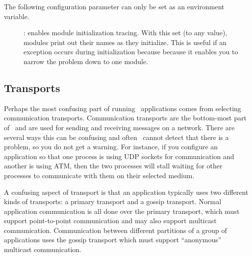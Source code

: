 The following configuration parameter can only be set as an
environment variable.
\begin{description}
\item
[]: enables module initialization tracing.  With this set (to
any value), modules print out their names as they initialize.  This is useful
if an exception  occurs during initialization because because it
enables you to narrow the problem down to one module.
\end{description}

\subsection{Transports}


Perhaps the most confusing part of running \ensemble\ applications comes from
selecting communication transports.  Communication transports are the
bottom-most part of \ensemble\ and are used for sending and receiving messages
on a network.  There are several ways this can be confusing and often
\ensemble\ cannot detect that there is a problem, so you do not get a warning.
For instance, if you configure an application so that one process is using UDP
sockets for communication and another is using ATM, then the two processes will
stall waiting for other processes to communicate with them on their selected
medium.

A confusing aspect of transport is that an application typically uses two
different kinds of transports: a primary transport and a gossip transport.
Normal application communication is all done over the primary transport, which
must support point-to-point communication and may also support multicast
communication.  Communication between different partitions of a group of
applications uses the gossip transport which must support ``anonymous''
multicast communication.


